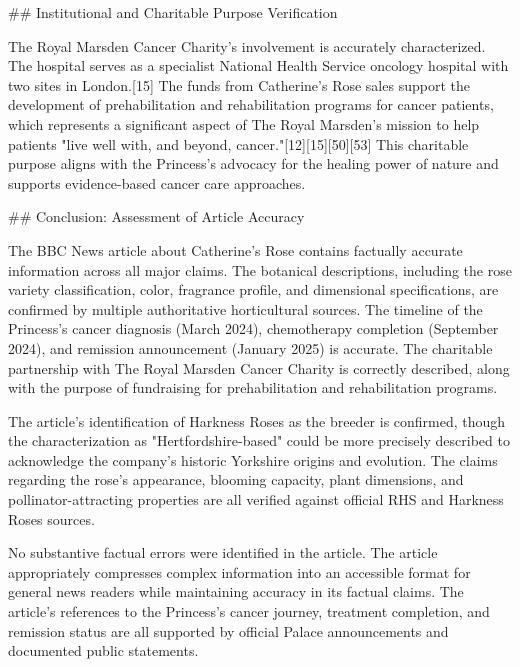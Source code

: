 \documentclass[10pt,a4paper]{article}
\begin{document}
\par\medskip
\#\# Institutional and Charitable Purpose Verification
\par\medskip
The Royal Marsden Cancer Charity's involvement is accurately characterized. The hospital serves as a specialist National Health Service oncology hospital with two sites in London.[15] The funds from Catherine's Rose sales support the development of prehabilitation and rehabilitation programs for cancer patients, which represents a significant aspect of The Royal Marsden's mission to help patients "live well with, and beyond, cancer."[12][15][50][53] This charitable purpose aligns with the Princess's advocacy for the healing power of nature and supports evidence-based cancer care approaches.
\par\medskip
\#\# Conclusion: Assessment of Article Accuracy
\par\medskip
The BBC News article about Catherine's Rose contains factually accurate information across all major claims. The botanical descriptions, including the rose variety classification, color, fragrance profile, and dimensional specifications, are confirmed by multiple authoritative horticultural sources. The timeline of the Princess's cancer diagnosis (March 2024), chemotherapy completion (September 2024), and remission announcement (January 2025) is accurate. The charitable partnership with The Royal Marsden Cancer Charity is correctly described, along with the purpose of fundraising for prehabilitation and rehabilitation programs.
\par\medskip
The article's identification of Harkness Roses as the breeder is confirmed, though the characterization as "Hertfordshire-based" could be more precisely described to acknowledge the company's historic Yorkshire origins and evolution. The claims regarding the rose's appearance, blooming capacity, plant dimensions, and pollinator-attracting properties are all verified against official RHS and Harkness Roses sources.
\par\medskip
No substantive factual errors were identified in the article. The article appropriately compresses complex information into an accessible format for general news readers while maintaining accuracy in its factual claims. The article's references to the Princess's cancer journey, treatment completion, and remission status are all supported by official Palace announcements and documented public statements.
\vspace{1em}

\end{document}
